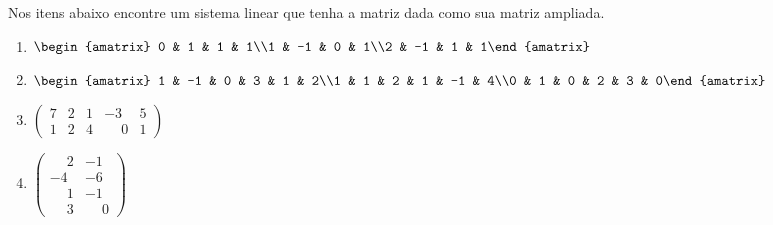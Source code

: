 \documentclass[12pt]{exam}
\begin{document}
\begin{exercicio}
  Nos itens abaixo encontre um sistema linear que tenha a matriz dada como sua matriz ampliada.
  \begin{multicols}{2}
    \begin{enumerate}[label={\alph*})]
      \item $\begin{amatrix}{3}0 & 1 & 1 & 1\\1 & -1 & 0 & 1\\2 & -1 & 1 & 1\end{amatrix}$
      \item $\begin{amatrix}{5}1 & -1 & 0 & 3 & 1 & 2\\1 & 1 & 2 & 1 & -1 & 4\\0 & 1 & 0 & 2 & 3 & 0\end{amatrix}$
      \item $\begin{pmatrix}7 & 2 & 1 & -3 & 5\\1 & 2 & 4 & \phantom{-} 0 & 1\end{pmatrix}$
      \item $\begin{pmatrix}\phantom{-} 2 & -1 \\ -4 & -6\\ \phantom{-} 1 & -1\\\phantom{-} 3 & \phantom{-} 0\end{pmatrix}$
    \end{enumerate}
  \end{multicols}
\end{exercicio}
\end{document}
